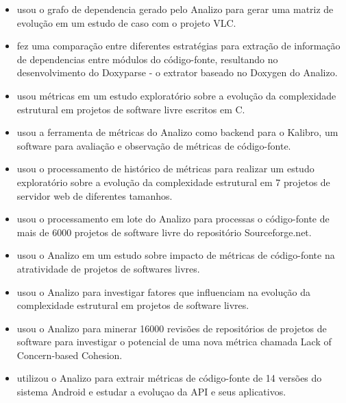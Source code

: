 \begin{itemize}

  \item \cite{Amaral2009} usou o grafo de dependencia gerado pelo Analizo para
  gerar uma matriz de evolução em um estudo de caso com o projeto VLC.

  \item \cite{Costa2009} fez uma comparação entre diferentes estratégias para
  extração de informação de dependencias entre módulos do código-fonte,
  resultando no desenvolvimento do Doxyparse - o extrator baseado no Doxygen do
  Analizo.

  \item \cite{Terceiro2009} usou métricas em um estudo exploratório sobre a
  evolução da complexidade estrutural em projetos de software livre escritos em
  C.

  \item \cite{Morais2009} usou a ferramenta de métricas do Analizo como backend
  para o Kalibro, um software para avaliação e observação de métricas de código-fonte.
  
  \item \cite{Terceiro2010} usou o processamento de histórico de métricas para
  realizar um estudo exploratório sobre a evolução da complexidade estrutural em
  7 projetos de servidor web de diferentes tamanhos.

  \item \cite{Meirelles2010} usou o processamento em lote do Analizo para
  processas o código-fonte de mais de 6000 projetos de software livre do
  repositório Sourceforge.net.

  \item \cite{Meirelles2011} usou o Analizo em um estudo sobre impacto de
  métricas de código-fonte na atratividade de projetos de softwares livres.

  \item \cite{Terceiro2012Understanding} usou o Analizo para investigar fatores
  que influenciam na evolução da complexidade estrutural em projetos de software
  livres.

  \item \cite{Silva2012} usou o Analizo para minerar 16000 revisões de
  repositórios de projetos de software para investigar o potencial de uma nova
  métrica chamada Lack of Concern-based Cohesion.

  \item \cite{Ronaldo2015} utilizou o Analizo para extrair métricas de
  código-fonte de 14 versões do sistema Android e estudar a evoluçao da API e
  seus aplicativos.

\end{itemize}

